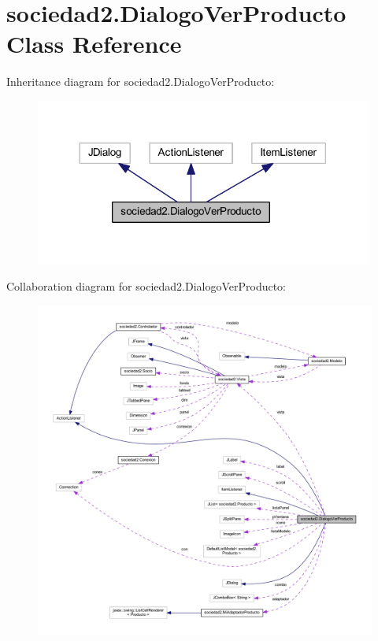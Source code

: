\hypertarget{classsociedad2_1_1_dialogo_ver_producto}{}\section{sociedad2.\+Dialogo\+Ver\+Producto Class Reference}
\label{classsociedad2_1_1_dialogo_ver_producto}


Inheritance diagram for sociedad2.\+Dialogo\+Ver\+Producto\+:\nopagebreak
\begin{figure}[H]
\begin{center}
\leavevmode
\includegraphics[width=314pt]{classsociedad2_1_1_dialogo_ver_producto__inherit__graph}
\end{center}
\end{figure}


Collaboration diagram for sociedad2.\+Dialogo\+Ver\+Producto\+:
\nopagebreak
\begin{figure}[H]
\begin{center}
\leavevmode
\includegraphics[width=350pt]{classsociedad2_1_1_dialogo_ver_producto__coll__graph}
\end{center}
\end{figure}
